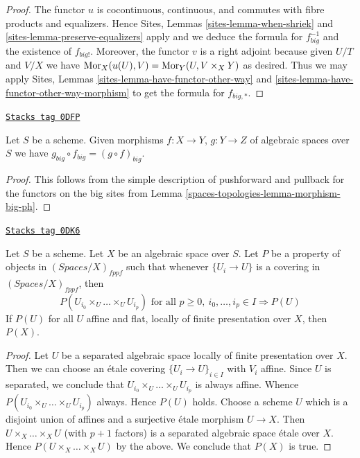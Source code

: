 \begin{proof}
The functor $u$ is cocontinuous, continuous, and commutes with fibre products
and equalizers. Hence
Sites, Lemmas \ref{sites-lemma-when-shriek} and
\ref{sites-lemma-preserve-equalizers}
apply and we deduce the formula
for $f_{big}^{-1}$ and the existence of $f_{big!}$. Moreover,
the functor $v$ is a right adjoint because given $U/T$ and $V/X$
we have $\operatorname{Mor}_X(u(U), V) = \operatorname{Mor}_Y(U, V \times_X Y)$
as desired. Thus we may apply
Sites, Lemmas \ref{sites-lemma-have-functor-other-way} and
\ref{sites-lemma-have-functor-other-way-morphism} to get the
formula for $f_{big, *}$.
\end{proof}

\begin{lemma}[Composition ph]
\label{spaces-topologies-lemma-composition-ph}
\href{https://stacks.math.columbia.edu/tag/0DFP}{\texttt{Stacks tag 0DFP}}

Let $S$ be a scheme. Given morphisms $f : X \to Y$, $g : Y \to Z$
of algebraic spaces over $S$ we have
$g_{big} \circ f_{big} = (g \circ f)_{big}$.
\end{lemma}

\begin{proof}
This follows from the simple description of pushforward
and pullback for the functors on the big sites from
Lemma \ref{spaces-topologies-lemma-morphism-big-ph}.
\end{proof}

\begin{lemma}
\label{spaces-topologies-lemma-cech-enough}
\href{https://stacks.math.columbia.edu/tag/0DK6}{\texttt{Stacks tag 0DK6}}

Let $S$ be a scheme. Let $X$ be an algebraic space over $S$.
Let $P$ be a property of objects in $(\textit{Spaces}/X)_{fppf}$
such that whenever $\{U_i \to U\}$ is a covering in
$(\textit{Spaces}/X)_{fppf}$, then
$$
P(U_{i_0} \times_U \ldots \times_U U_{i_p})
\text{ for all }
p \geq 0,\ i_0, \ldots, i_p \in I
\Rightarrow P(U)
$$
If $P(U)$ for all $U$ affine and flat, locally of finite presentation over $X$,
then $P(X)$.
\end{lemma}

\begin{proof}
Let $U$ be a separated algebraic space locally of finite presentation over $X$.
Then we can choose an \'etale covering $\{U_i \to U\}_{i \in I}$ with $V_i$
affine. Since $U$ is separated, we conclude that
$U_{i_0} \times_U \ldots \times_U U_{i_p}$ is always affine.
Whence $P(U_{i_0} \times_U \ldots \times_U U_{i_p})$ always.
Hence $P(U)$ holds. Choose a scheme $U$ which is a disjoint union of
affines and a surjective \'etale morphism $U \to X$.
Then $U \times_X \ldots \times_X U$ (with $p + 1$ factors)
is a separated algebraic space
\'etale over $X$. Hence $P(U \times_X \ldots \times_X U)$ by the above.
We conclude that $P(X)$ is true.
\end{proof}

